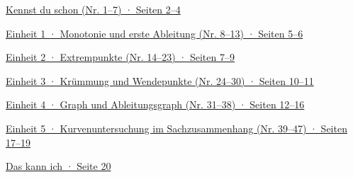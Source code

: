 \documentclass[11pt]{article}
\newcommand{\verzeile}[2]{\noindent\hyperlink{#1}{#2}\par\medskip}
\def\SeZone{2–4}
\def\SeEa{5–6}
\def\SeEb{7–9}
\def\SeEc{10–11}
\def\SeEd{12–16}
\def\SeEe{17–19}
\def\SeAbh{20}
\begin{document}
\verzeile{zone}{Kennst du schon (Nr. 1–7) · Seiten \SeZone}
\verzeile{e1}{Einheit 1 · Monotonie und erste Ableitung (Nr. 8–13) · Seiten \SeEa}
\verzeile{e2}{Einheit 2 · Extrempunkte (Nr. 14–23) · Seiten \SeEb}
\verzeile{e3}{Einheit 3 · Krümmung und Wendepunkte (Nr. 24–30) · Seiten \SeEc}
\verzeile{e4}{Einheit 4 · Graph und Ableitungsgraph (Nr. 31–38) · Seiten \SeEd}
\verzeile{e5}{Einheit 5 · Kurvenuntersuchung im Sachzusammenhang (Nr. 39–47) · Seiten \SeEe}
\verzeile{abhaken}{Das kann ich · Seite \SeAbh}
\clearpage

\clearpage

\clearpage

\clearpage

\clearpage

\clearpage


\end{document}
